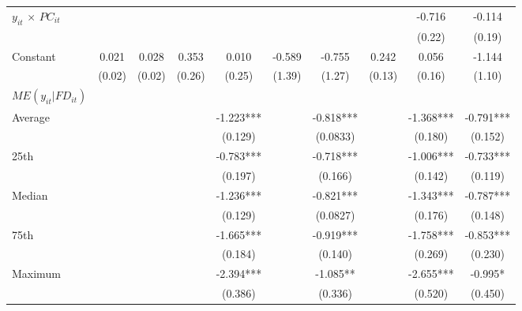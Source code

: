 \documentclass[12pt, a4paper]{article}
\begin{document}
\begin{appendices}
\begin{table}[htbp]
\begin{threeparttable}
{\begin{tabular}{l*{9}{c}}
				$y_{it}$ $\times$ $PC_{it}$ &                     &                     &                     &                     &                     &                     &                     &      -0.716\sym{**} &      -0.114         \\
				&                     &                     &                     &                     &                     &                     &                     &      (0.22)         &      (0.19)         \\
				Constant            &       0.021         &       0.028         &       0.353         &       0.010         &      -0.589         &      -0.755         &       0.242         &       0.056         &      -1.144         \\
				&      (0.02)         &      (0.02)         &      (0.26)         &      (0.25)         &      (1.39)         &      (1.27)         &      (0.13)         &      (0.16)         &      (1.10)         \\
				\hline
				$ME(y_{it}|FD_{it})$\\
				Average&&&&	-1.223***	&&	-0.818***	&&	-1.368***	&	-0.791***\\
				&&&&(0.129)   &&		(0.0833)   	&&	(0.180)   &		(0.152)   \\
				
				25th&&&&	-0.783***	&&	-0.718***&&		-1.006***	&	-0.733***\\
				&&&&(0.197)   &&		(0.166)   &&		(0.142)   &		(0.119)   \\
				
				Median&&&&	-1.236***	&&	-0.821***	&&	-1.343***	&	-0.787***\\
				&&&&(0.129)   &&		(0.0827)   &&		(0.176)   &		(0.148)   \\
				
				75th&&&&	-1.665***	&&	-0.919***	&&	-1.758***	&	-0.853***\\
				&&&&(0.184)   &&		(0.140)   	&&	(0.269)   &		(0.230)   \\
				
				Maximum&&&&	-2.394***	&&	-1.085** 	&&	-2.655***&		-0.995*  \\
				&&&&(0.386)   &&		(0.336)   	&&	(0.520) & 		(0.450) \\
				
				
				

\end{tabular}}
\end{threeparttable}
\end{table}
\end{appendices}
\end{document}
